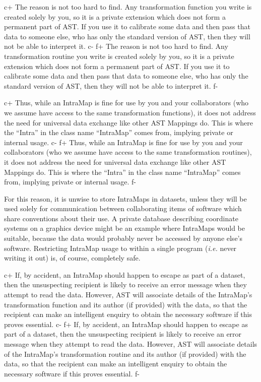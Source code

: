\documentclass[twoside,11pt]{article}
\begin{document}
c+
The reason is not too hard to find. Any transformation function you
write is created solely by you, so it is a private extension which
does not form a permanent part of AST. If you use it to calibrate some
data and then pass that data to someone else, who has only the
standard version of AST, then they will not be able to interpret it.
c-
f+
The reason is not too hard to find. Any transformation routine you
write is created solely by you, so it is a private extension which
does not form a permanent part of AST. If you use it to calibrate some
data and then pass that data to someone else, who has only the
standard version of AST, then they will not be able to interpret it.
f-

c+
Thus, while an IntraMap is fine for use by you and your collaborators
(who we assume have access to the same transformation functions), it
does not address the need for universal data exchange like other AST
Mappings do. This is where the ``Intra'' in the class name
``IntraMap'' comes from, implying private or internal usage.
c-
f+
Thus, while an IntraMap is fine for use by you and your collaborators
(who we assume have access to the same transformation routines), it
does not address the need for universal data exchange like other AST
Mappings do. This is where the ``Intra'' in the class name
``IntraMap'' comes from, implying private or internal usage.
f-

For this reason, it is unwise to store IntraMaps in datasets, unless
they will be used solely for communication between collaborating items
of software which share conventions about their use.  A private
database describing coordinate systems on a graphics device might be
an example where IntraMaps would be suitable, because the data would
probably never be accessed by anyone else's software. Restricting
IntraMap usage to within a single program ({\em{i.e.}} never writing
it out) is, of course, completely safe.

c+
If, by accident, an IntraMap should happen to escape as part of a
dataset, then the unsuspecting recipient is likely to receive an error
message when they attempt to read the data. However, AST will
associate details of the IntraMap's transformation function and its
author (if provided) with the data, so that the recipient can make an
intelligent enquiry to obtain the necessary software if this proves
essential.
c-
f+
If, by accident, an IntraMap should happen to escape as part of a
dataset, then the unsuspecting recipient is likely to receive an error
message when they attempt to read the data. However, AST will
associate details of the IntraMap's transformation routine and its
author (if provided) with the data, so that the recipient can make an
intelligent enquiry to obtain the necessary software if this proves
essential.
f-
\end{document}
